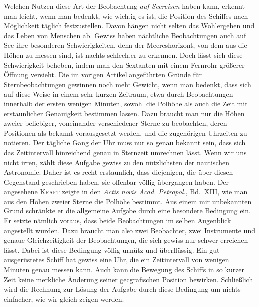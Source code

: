 Welchen Nutzen diese Art der Beobachtung \textit{auf Seereisen} haben kann, erkennt man leicht, wenn man bedenkt, wie wichtig es ist, die Position des Schiffes nach Möglichkeit täglich festzustellen. Davon hängen nicht selten das Wohlergehen und das Leben von Menschen ab. Gewiss haben nächtliche Beobachtungen auch auf See ihre besonderen Schwierigkeiten, denn der Meereshorizont, von dem aus die Höhen zu messen sind, ist nachts schlechter zu erkennen. Doch lässt sich diese Schwierigkeit beheben, indem man den Sextanten mit einem Fernrohr größerer Öffnung versieht.
Die im vorigen Artikel angeführten Gründe für Sternbeobachtungen gewinnen noch mehr Gewicht, wenn man bedenkt, dass sich auf diese Weise in einem sehr kurzen Zeitraum, etwa durch Beobachtungen innerhalb der ersten wenigen Minuten, sowohl die Polhöhe als auch die Zeit mit erstaunlicher Genauigkeit bestimmen lassen. Dazu braucht man nur die Höhen zweier beliebiger, voneinander verschiedener Sterne zu beobachten, deren Positionen als bekannt vorausgesetzt werden, und die zugehörigen Uhrzeiten zu notieren. Der tägliche Gang der Uhr muss nur so genau bekannt sein, dass sich das Zeitintervall hinreichend genau in Sternzeit umrechnen lässt. Wenn wir uns nicht irren, zählt diese Aufgabe gewiss zu den nützlichsten der nautischen Astronomie. Daher ist es recht erstaunlich, dass diejenigen, die über diesen Gegenstand geschrieben haben, sie offenbar völlig übergangen haben. Der angesehene \textsc{Kraft} zeigte in den \textit{Actis novis Acad. Petropol.}, Bd.~XIII, wie man aus den Höhen zweier Sterne die Polhöhe bestimmt. Aus einem mir unbekannten Grund schränkte er die allgemeine Aufgabe durch eine besondere Bedingung ein. Er setzte nämlich voraus, dass beide Beobachtungen im selben Augenblick
angestellt wurden. Dazu braucht man also zwei Beobachter, zwei Instrumente und genaue Gleichzeitigkeit der Beobachtungen, die sich gewiss nur schwer erreichen lässt. Dabei ist diese Bedingung völlig unnütz und überflüssig. Ein gut ausgerüstetes Schiff hat gewiss eine Uhr, die ein Zeitintervall von wenigen Minuten genau messen kann. Auch kann die Bewegung des Schiffs in so kurzer Zeit keine merkliche Änderung seiner geografischen Position bewirken. Schließlich wird die Rechnung zur Lösung der Aufgabe durch diese Bedingung um nichts einfacher, wie wir gleich zeigen werden.
